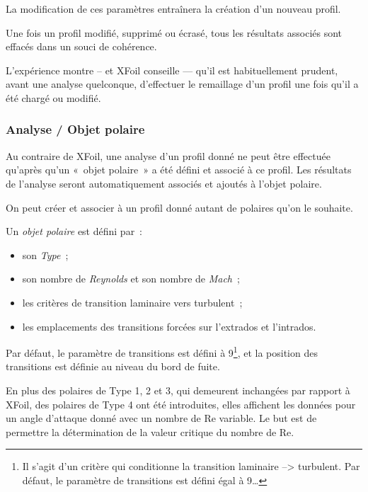 \documentclass[a4paper,twoside,12pt,dvips]{article}
\begin{document}
La modification de ces paramètres entraînera la création d’un nouveau 
profil. 

Une fois un profil modifié, supprimé ou écrasé, tous les résultats associés 
sont effacés dans un souci de cohérence. 

L’expérience montre – et XFoil conseille — qu’il est habituellement prudent, avant une analyse quelconque, d’effectuer le remaillage d’un profil une fois qu’il a été chargé ou modifié.

\subsubsection{Analyse / Objet polaire}

Au contraire de XFoil, une analyse d’un profil donné ne peut être effectuée 
qu’après qu’un «~objet polaire~» a été défini et associé à ce profil. Les 
résultats de l’analyse seront automatiquement associés et ajoutés à l’objet
polaire. 

On peut créer et associer à un profil donné autant de polaires qu’on le 
souhaite. 

Un \emph{objet polaire} est défini par~:
\begin{itemize}
  \item son \textit{Type}~;
  \item son nombre de \textit{Reynolds} et son nombre de \textit{Mach}~;
  \item les critères de transition laminaire vers turbulent~;
  \item les emplacements des transitions forcées sur l’extrados et 
  l’intrados.
\end{itemize}

Par défaut, le paramètre de transitions est défini à 9\footnote{Il s'agit d’un critère qui conditionne la transition laminaire --> turbulent. Par défaut, le paramètre de transitions est défini égal à 9\dots}, et la position des transitions est définie au niveau du bord de fuite.

En plus des polaires de Type 1, 2 et 3, qui demeurent inchangées par rapport 
à XFoil, des polaires de Type 4 ont été introduites, elles affichent les 
données pour un angle d’attaque donné avec un nombre de Re variable. Le but
est de permettre la détermination de la valeur critique du nombre de Re.
\end{document}
